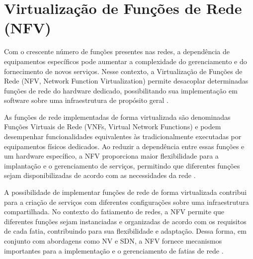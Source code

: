 \section{Virtualização de Funções de Rede (NFV)}

Com o crescente número de funções presentes nas redes, a dependência de equipamentos específicos pode aumentar a complexidade do gerenciamento e do fornecimento de novos serviços. Nesse contexto, a Virtualização de Funções de Rede (NFV, Network Function Virtualization) permite desacoplar determinadas funções de rede do hardware dedicado, possibilitando sua implementação em software sobre uma infraestrutura de propósito geral \cite{yi2018comprehensive}.

As funções de rede implementadas de forma virtualizada são denominadas Funções Virtuais de Rede (VNFs, Virtual Network Functions) e podem desempenhar funcionalidades equivalentes às tradicionalmente executadas por equipamentos físicos dedicados. Ao reduzir a dependência entre essas funções e um hardware específico, a NFV proporciona maior flexibilidade para a implantação e o gerenciamento de serviços, permitindo que diferentes funções sejam disponibilizadas de acordo com as necessidades da rede \cite{yi2018comprehensive}.

A possibilidade de implementar funções de rede de forma virtualizada contribui para a criação de serviços com diferentes configurações sobre uma infraestrutura compartilhada. No contexto do fatiamento de redes, a NFV permite que diferentes funções sejam instanciadas e organizadas de acordo com os requisitos de cada fatia, contribuindo para sua flexibilidade e adaptação. Dessa forma, em conjunto com abordagens como NV e SDN, a NFV fornece mecanismos importantes para a implementação e o gerenciamento de fatias de rede \cite{gomes2020strategies}.